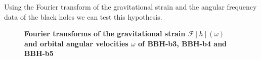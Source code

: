 Using the Fourier transform of the gravitational strain and the angular frequency data of the black holes we can test this hypothesis.\\
\begin{figure}
\centering
    \textbf{Fourier transforms of the gravitational strain  $\mathcal{F}[h](\omega)$ and orbital angular velocities $\omega$ of BBH-b3, BBH-b4 and BBH-b5}\par\medskip
\centering

 \quad
{} 

   \quad

    \quad
{}
  

\end{figure}
